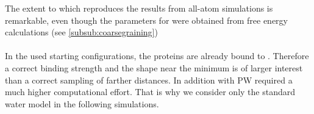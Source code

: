 The extent to which \martini{} reproduces the results from all-atom simulations is remarkable, even though the parameters for \martini{} were obtained from free energy calculations (see \autoref{subsub:coarsegraining})\\
\\
In the used starting configurations, the proteins are already bound to \pip{}. Therefore a correct binding strength and the shape near the minimum is of larger interest than a correct sampling of farther distances. In addition \martini{} with PW required a much higher computational effort. That is why we consider only the standard water model in the following simulations.

